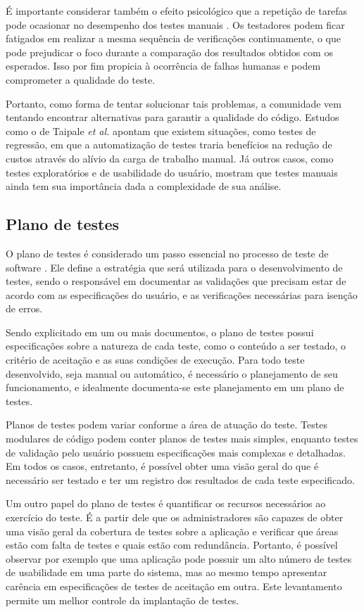 É importante considerar também o efeito psicológico que a repetição de tarefas pode ocasionar no desempenho dos testes manuais \cite{desikan}. Os testadores podem ficar fatigados em realizar a mesma sequência de verificações continuamente, o que pode prejudicar o foco durante a comparação dos resultados obtidos com os esperados. Isso por fim propicia à ocorrência de falhas humanas e podem comprometer a qualidade do teste.

Portanto, como forma de tentar solucionar tais problemas, a comunidade vem tentando encontrar alternativas para garantir a qualidade do código. Estudos como o de Taipale \emph{et al.} \cite{taipale} apontam que existem situações, como testes de regressão, em que a automatização de testes traria benefícios na redução de custos através do alívio da carga de trabalho manual. Já outros casos, como testes exploratórios e de usabilidade do usuário, mostram que testes manuais ainda tem sua importância dada a complexidade de sua análise.

\hypertarget{teoria-do-plano-de-testes}{%
\subsection{Plano de testes}\label{teoria-do-plano-de-testes}}

O plano de testes é considerado um passo essencial no processo de teste de software \cite{nguyen}. Ele define a estratégia que será utilizada para o desenvolvimento de testes, sendo o responsável em documentar as validações que precisam estar de acordo com as especificações do usuário, e as verificações necessárias para isenção de erros.

Sendo explicitado em um ou mais documentos, o plano de testes possui especificações sobre a natureza de cada teste, como o conteúdo a ser testado, o critério de aceitação e as suas condições de execução. Para todo teste desenvolvido, seja manual ou automático, é necessário o planejamento de seu funcionamento, e idealmente documenta-se este planejamento em um plano de testes.

Planos de testes podem variar conforme a área de atuação do teste. Testes modulares de código podem conter planos de testes mais simples, enquanto testes de validação pelo usuário possuem especificações mais complexas e detalhadas. Em todos os casos, entretanto, é possível obter uma visão geral do que é necessário ser testado e ter um registro dos resultados de cada teste especificado.

Um outro papel do plano de testes é quantificar os recursos necessários ao exercício do teste. É a partir dele que os administradores são capazes de obter uma visão geral da cobertura de testes sobre a aplicação e verificar que áreas estão com falta de testes e quais estão com redundância. Portanto, é possível observar por exemplo que uma aplicação pode possuir um alto número de testes de usabilidade em uma parte do sistema, mas ao mesmo tempo apresentar carência em especificações de testes de aceitação em outra. Este levantamento permite um melhor controle da implantação de testes.

